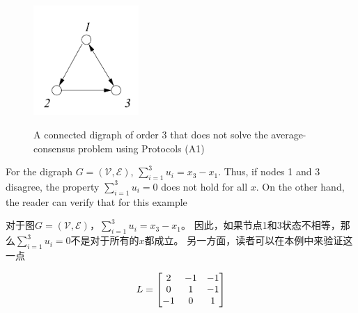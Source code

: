 \documentclass{article}
\begin{document}
\begin{figure}[htbp]
    \centering
    \includegraphics[width=4cm]{figures/Fig2-ConnectedDigraph.jpeg}
    \label{ConnectedDigraph}
    \caption{A connected digraph of order 3 that does not solve the average-consensus problem using Protocols (A1)}
\end{figure}

{\color[gray]{0.5}
For the digraph $G=(\mathcal{V}, \mathcal{E})$, $\sum_{i=1}^{3}u_i = x_3 - x_1$. 
Thus, if nodes 1 and 3 disagree, the property $\sum_{i=1}^{3}u_i = 0$ does not hold for all $x$. 
On the other hand, the reader can verify that for this example
}

对于图$G=(\mathcal{V}, \mathcal{E})$，$\sum_{i=1}^{3}u_i = x_3 - x_1$。
因此，如果节点1和3状态不相等，那么$\sum_{i=1}^{3}u_i = 0$不是对于所有的$x$都成立。
另一方面，读者可以在本例中来验证这一点

\begin{equation}
    L = \left[
    \begin{matrix}
        2 & -1 & -1 \\
        0 & 1 & -1 \\
        -1 & 0 & 1 
    \end{matrix}
    \right]
    \notag
\end{equation}

\end{document}

